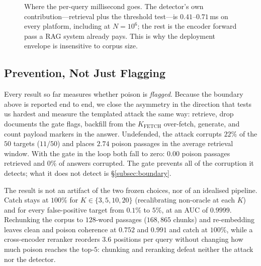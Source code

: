 \documentclass[10pt,journal,compsoc]{IEEEtran}
\begin{document}
\begin{figure}[H]
\centering
{}
\caption{Where the per-query millisecond goes. The detector's own contribution---retrieval plus
the threshold test---is $0.41$--$0.71$\,ms on every platform, including at $N=10^6$; the rest is
the encoder forward pass a RAG system already pays. This is why the deployment envelope is
insensitive to corpus size.}
\label{fig:latency}
\end{figure}

\subsection{Prevention, Not Just Flagging}
\label{subsec:e2e}
Every result so far measures whether poison is \emph{flagged}. Because the boundary above is
reported end to end, we close the asymmetry in the direction that tests us hardest and measure
the templated attack the same way: retrieve, drop documents the gate flags, backfill from the
$K_{\mathrm{FETCH}}$ over-fetch, generate, and count payload markers in the answer. Undefended,
the attack corrupts $22\%$ of the $50$ targets ($11/50$) and places $2.74$ poison passages in the average
retrieval window. With the gate in the loop both fall to zero: $0.00$ poison passages retrieved
and $0\%$ of answers corrupted. The gate prevents all of the corruption it detects; what it does
not detect is \S\ref{subsec:boundary}.

The result is not an artifact of the two frozen choices, nor of an idealised pipeline. Catch
stays at $100\%$ for $K\in\{3,5,10,20\}$ (recalibrating non-oracle at each $K$) and for every
false-positive target from $0.1\%$ to $5\%$, at an AUC of $0.9999$. Rechunking the corpus to
$128$-word passages ($168{,}865$ chunks) and re-embedding leaves clean and poison coherence at
$0.752$ and $0.991$ and catch at $100\%$, while a cross-encoder reranker reorders $3.6$ positions
per query without changing how much poison reaches the top-$5$: chunking and reranking defeat
neither the attack nor the detector.
\end{document}

